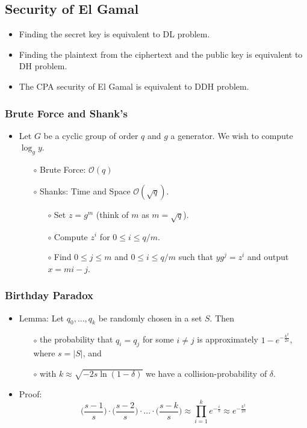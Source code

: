 \documentclass[a4paper]{scrartcl}
\begin{document}
\subsection*{Security of El Gamal}

\begin{itemize}
\item Finding the secret key is equivalent to DL problem.
\item Finding the plaintext from the ciphertext and the public key is equivalent to DH problem.
\item The CPA security of El Gamal is equivalent to DDH problem.
\end{itemize}

\subsubsection*{Brute Force and Shank's}

\begin{itemize}
\item Let $G$ be a cyclic group of order $q$ and $g$ a generator. We wish to compute $\log_gy$.
\begin{itemize}
\item [$\circ$] Brute Force: $\mathcal{O}(q)$
\item [$\circ$] Shanks: Time and Space $\mathcal{O}(\sqrt{q})$.
\begin{itemize}
\item [$\circ$] Set $z = g^m$ (think of $m$ as $m = \sqrt{q}$).
\item [$\circ$] Compute $z^i$ for $0 \leq i \leq q/m$.
\item [$\circ$] Find $0 \leq j \leq m$ and $0 \leq i \leq q/m$ such that $yg^j = z^i$ and output $x = mi - j$.
\end{itemize}
\end{itemize}
\end{itemize}

\subsubsection*{Birthday Paradox}

\begin{itemize}
\item Lemma: Let $q_0, ..., q_k$ be randomly chosen in a set $S$. Then
\begin{itemize}
\item [$\circ$] the probability that $q_i = q_j$ for some $i \neq j$ is approximately $1-e^{-\frac{k^2}{2s}}$, where $s = |S|$, and
\item [$\circ$] with $k \approx \sqrt{-2s \ln (1 - \delta)}$ we have a collision-probability of $\delta$.
\end{itemize}
\item Proof: 
$$\bigg(\frac{s-1}{s}\bigg) \cdot \bigg(\frac{s-2}{s}\bigg) \cdot ... \cdot \bigg(\frac{s-k}{s}\bigg) \approx \prod_{i=1}^{k}e^{-\frac{i}{s}} \approx e^{-\frac{k^2}{2s}}$$
\end{itemize}
\end{document}
